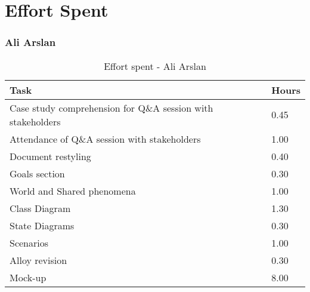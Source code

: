 \chapter{Effort Spent}

\subsection{Ali Arslan}
\renewcommand{\arraystretch}{2}
\begin{longtable}{|m{9cm}|m{1.2cm}|}
\caption{Effort spent - Ali Arslan}\\
\hline
\endfirsthead
\endhead
\hline
\endlastfoot
\rowcolor{green2}
\textbf{Task} & \hfil {\textbf{Hours}}\\
\hline
Case study comprehension for Q\&A session with stakeholders & \hfil 0.45\\
Attendance of Q\&A session with stakeholders & \hfil 1.00\\
Document restyling	& \hfil 0.40\\
Goals section & \hfil 0.30\\
World and Shared phenomena & \hfil 1.00\\
Class Diagram & \hfil 1.30\\
State Diagrams & \hfil 0.30\\
Scenarios & \hfil 1.00\\
Alloy revision & \hfil 0.30\\
Mock-up  & \hfil 8.00\\
\hline
\end{longtable}

